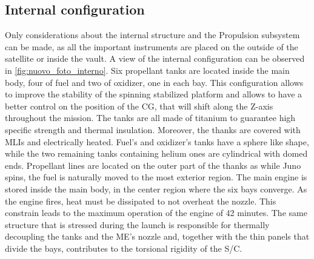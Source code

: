 \subsection{Internal configuration}
\label{subsec:internal_config}


Only considerations about the internal structure and the Propulsion subsystem can be made, as all the important instruments are placed on the outside of the satellite or inside the vault. A view of the internal configuration can be observed in \autoref{fig:nuovo_foto_interno}. Six propellant tanks are located inside the main body, four of fuel and two of oxidizer, one in each bay. This configuration allows to improve the stability of the spinning stabilized platform and allows to have a better control on the position of the CG, that will shift along the Z-axis throughout the mission. The tanks are all made of titanium to guarantee high specific strength and thermal insulation.\cite{LL_early_cruise} Moreover, the thanks are covered with MLIs and electrically heated. Fuel's and oxidizer's tanks have a sphere like shape, while the two remaining tanks containing helium ones are cylindrical with domed ends. Propellant lines are located on the outer part of the thanks as while Juno spins, the fuel is naturally moved to the most exterior region. The main engine is stored inside the main body, in the center region where the six bays converge.\cite{Leros}\cite{Juno_launch} As the engine fires, heat must be dissipated to not overheat the nozzle. This constrain leads to the maximum operation of the engine of 42 minutes.\cite{Leros} The same structure that is stressed during the launch is responsible for thermally decoupling the tanks and the ME's nozzle and, together with the thin panels that divide the bays, contributes to the torsional rigidity of the S/C. 

